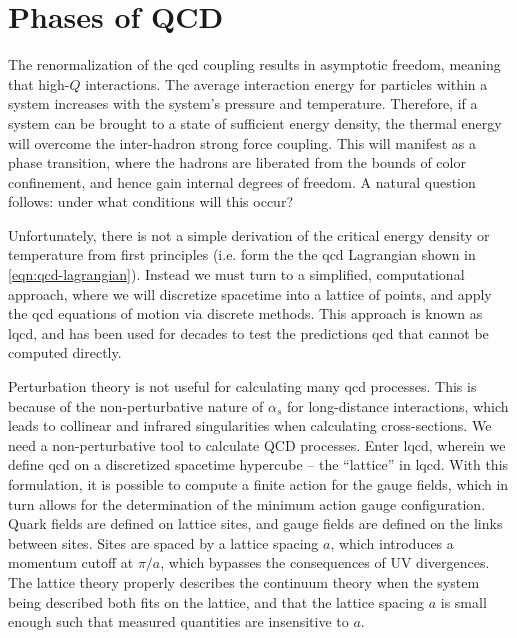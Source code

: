 \section{Phases of QCD}
\label{sec:phases-of-qcd}

The renormalization of the \gls{qcd} coupling results in asymptotic freedom, meaning that high-$Q$ interactions.
The average interaction energy for particles within a system increases with the system's pressure and temperature.
Therefore, if a system can be brought to a state of sufficient energy density, the thermal energy will overcome the inter-hadron strong force coupling.
This will manifest as a phase transition, where the hadrons are liberated from the bounds of color confinement, and hence gain internal degrees of freedom.
A natural question follows: under what conditions will this occur?




Unfortunately, there is not a simple derivation of the critical energy density or temperature from first principles (i.e. form the the \gls{qcd} Lagrangian shown in \ref{eqn:qcd-lagrangian}).
Instead we must turn to a simplified, computational approach, where we will discretize spacetime into a lattice of points, and apply the \gls{qcd} equations of motion via discrete methods.
This approach is known as \gls{lqcd}, and has been used for decades to test the predictions \gls{qcd} that cannot be computed directly.

Perturbation theory is not useful for calculating many \gls{qcd} processes.
This is because of the non-perturbative nature of $\alpha_s$ for long-distance interactions, which leads to collinear and infrared singularities when calculating cross-sections.
We need a non-perturbative tool to calculate QCD processes.
Enter \gls{lqcd}, wherein we define \gls{qcd} on a discretized spacetime hypercube -- the ``lattice'' in \gls{lqcd}.
With this formulation, it is possible to compute a finite action for the gauge fields, which in turn allows for the determination of the minimum action gauge configuration.
Quark fields are defined on lattice sites, and gauge fields are defined on the links between sites.
Sites are spaced by a lattice spacing $a$, which introduces a momentum cutoff at $\pi / a$, which bypasses the consequences of UV divergences.
The lattice theory properly describes the continuum theory when the system being described both fits on the lattice, and that the lattice spacing $a$ is small enough such that measured quantities are insensitive to $a$.

